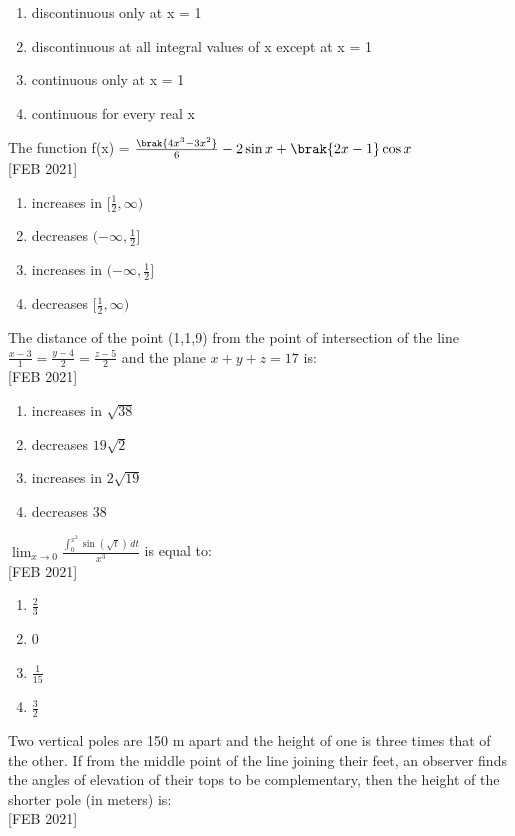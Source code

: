     \begin{enumerate}
        \item discontinuous only at x = 1
        \item discontinuous at all integral values of x except at x = 1
        \item continuous only at x = 1
        \item continuous for every real x
    \end{enumerate}
    \item The function f(x) = $\frac{\brak{4x^3 - 3x^2}}{6} - 2\sin{x} + \brak{2x -1}\cos{x}$ \\\hfill{[FEB 2021]}
    \begin{enumerate}
        \item increases in $[\frac{1}{2},\infty)$
        \item decreases $(-\infty,\frac{1}{2}]$
        \item increases in $(-\infty,\frac{1}{2}]$
        \item decreases  $[\frac{1}{2},\infty)$
    \end{enumerate}
    \item The distance of the point (1,1,9) from the point of intersection of the line $\frac{x - 3}{1} = \frac{y - 4}{2} = \frac{z - 5}{2}$ and the plane $x + y + z = 17$ is: \\\hfill{[FEB 2021]}
    \begin{enumerate}
        \item increases in $\sqrt{38}$
        \item decreases $19\sqrt{2}$
        \item increases in $2\sqrt{19}$
        \item decreases  $38$
    \end{enumerate}
    \item $\lim_{x \to 0} \frac{\int_{0}^{x^2} \sin(\sqrt{t}) \, dt}{x^3}$ is equal to: \\\hfill{[FEB 2021]}
    \begin{multicols}{4}
    \begin{enumerate}
        \item $\frac{2}{3}$
        \item 0
        \item $\frac{1}{15}$
        \item $\frac{3}{2}$
    \end{enumerate}
    \end{multicols}
    \item Two vertical poles are 150 m apart and the height of one is three times that of the other. If from the middle point of the line joining their feet, an observer finds the angles of elevation of their tops to be complementary, then the height of the shorter pole (in meters) is: \\\hfill{[FEB 2021]}
